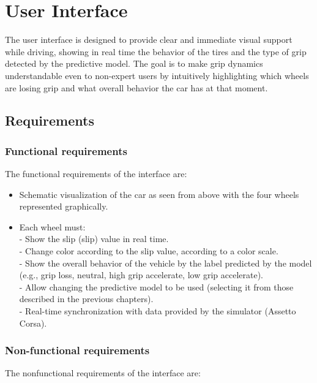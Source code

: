 \documentclass[a4paper,final,12pt]{report}
\begin{document}
\newpage

\section{User Interface}
The user interface is designed to provide clear and immediate visual support while driving, showing in real time the behavior of the tires and the type of grip detected by the predictive model. The goal is to make grip dynamics understandable even to non-expert users by intuitively highlighting which wheels are losing grip and what overall behavior the car has at that moment.

\subsection{Requirements}

\subsubsection{Functional requirements}
The functional requirements of the interface are:
\begin{itemize}
    \item Schematic visualization of the car as seen from above with the four wheels represented graphically.

    \item  Each wheel must:\\
    - Show the slip (slip) value in real time.\\
    - Change color according to the slip value, according to a color scale.\\
    - Show the overall behavior of the vehicle by the label predicted by the model (e.g., grip loss, neutral, high grip accelerate, low grip accelerate).\\
    - Allow changing the predictive model to be used (selecting it from those described in the previous chapters).\\
    - Real-time synchronization with data provided by the simulator (Assetto Corsa).
\end{itemize}

\subsubsection{Non-functional requirements}
The nonfunctional requirements of the interface are:
\end{document}
